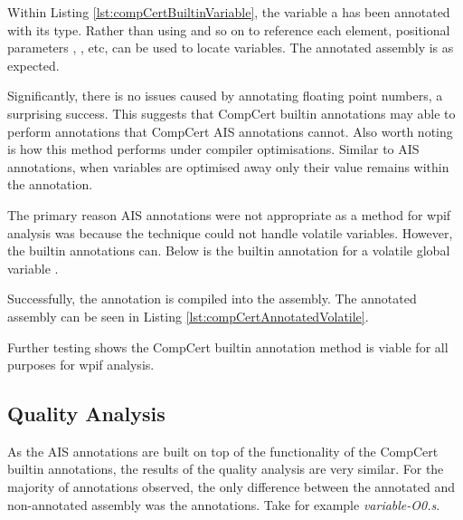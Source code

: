 Within Listing \ref{lst:compCertBuiltinVariable}, the variable a has been annotated with its type. Rather than using  and so on to reference each element, positional parameters , , etc, can be used to locate variables. The annotated assembly is as expected.



Significantly, there is no issues caused by annotating floating point numbers, a surprising success. This suggests that CompCert builtin annotations may able to perform annotations that CompCert AIS annotations cannot. Also worth noting is how this method performs under compiler optimisations. Similar to AIS annotations, when variables are optimised away only their value remains within the annotation.



The primary reason AIS annotations were not appropriate as a method for wpif analysis was because the technique could not handle volatile variables. However, the builtin annotations can. Below is the builtin annotation for a volatile global variable .



Successfully, the annotation is compiled into the assembly. The annotated assembly can be seen in Listing \ref{lst:compCertAnnotatedVolatile}.



Further testing shows the CompCert builtin annotation method is viable for all purposes for wpif analysis.

\subsection{Quality Analysis}

As the AIS annotations are built on top of the functionality of the CompCert builtin annotations, the results of the quality analysis are very similar. For the majority of annotations observed, the only difference between the annotated and non-annotated assembly was the annotations. Take for example \textit{variable-O0.s}.

